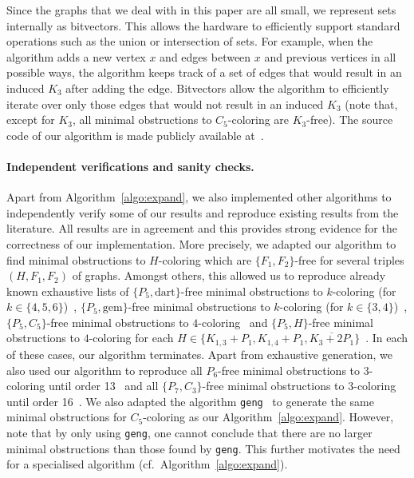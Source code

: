 \documentclass[11pt,a4paper]{article}
\theoremstyle{mystyle}
\begin{document}
Since the graphs that we deal with in this paper are all small, we represent sets internally as bitvectors. This allows the hardware to efficiently support standard operations such as the union or intersection of sets. For example, when the algorithm adds a new vertex $x$ and edges between $x$ and previous vertices in all possible ways, the algorithm keeps track of a set of edges that would result in an induced $K_3$ after adding the edge. Bitvectors allow the algorithm to efficiently iterate over only those edges that would not result in an induced $K_3$ (note that, except for $K_3$, all minimal obstructions to $C_5$-coloring are $K_3$-free). The source code of our algorithm is made publicly available at~\cite{gitrepo}.

\paragraph{Independent verifications and sanity checks.}
Apart from Algorithm~\ref{algo:expand}, we also implemented other algorithms to independently verify some of our results and reproduce existing results from the literature. All results are in agreement and this provides strong evidence for the correctness of our implementation. More precisely, we adapted our algorithm to find minimal obstructions to $H$-coloring which are $\{F_1,F_2\}$-free for several triples $(H,F_1,F_2)$ of graphs.
Amongst others, this allowed us to reproduce already known exhaustive lists of
$\{P_5,\text{dart}\}$-free minimal obstructions to $k$-coloring (for $k \in \{4,5,6\}$)~\cite{DBLP:conf/cocoa/XiaJGH23}, 
$\{P_5,\text{gem}\}$-free minimal obstructions to $k$-coloring (for $k \in \{3,4\}$)~\cite{DBLP:journals/dam/CaiGH23}, 
$\{P_5,C_5\}$-free minimal obstructions to $4$-coloring~\cite{DBLP:journals/dam/HoangMRSV15} and $\{P_5,H\}$-free minimal obstructions to $4$-coloring for each $H \in \{K_{1,3}+P_1,K_{1,4}+P_1,\overline{K_3+2P_1}\}$~\cite{DBLP:journals/corr/abs-2403-05611}. In each of these cases, our algorithm terminates. Apart from exhaustive generation, we also used our algorithm to reproduce all $P_6$-free minimal obstructions to $3$-coloring until order 13~\cite{DBLP:journals/jct/ChudnovskyGSZ20} and all $\{P_7,C_3\}$-free minimal obstructions to $3$-coloring until order 16~\cite{DBLP:journals/jgt/GoedgebeurS18}. We also adapted the algorithm \texttt{geng}~\cite{DBLP:journals/jsc/McKayP14} to generate the same minimal obstructions for $C_5$-coloring as our Algorithm~\ref{algo:expand}. However, note that by only using \texttt{geng}, one cannot conclude that there are no larger minimal obstructions than those found by \texttt{geng}. This further motivates the need for a specialised algorithm (cf.\ Algorithm~\ref{algo:expand}).
\end{document}

